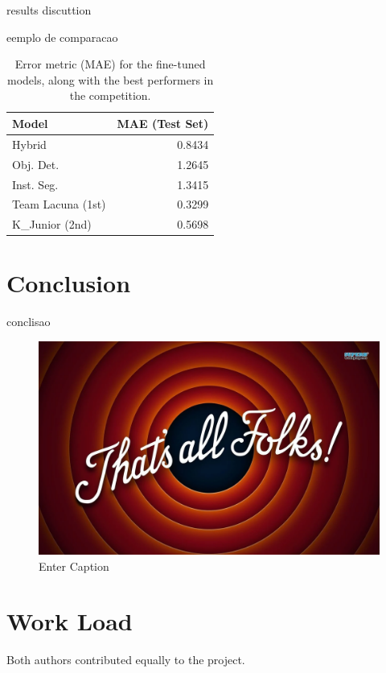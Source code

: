 \documentclass[conference]{IEEEtran}
\begin{document}
results discuttion

eemplo de comparacao

\begin{table}[H]
\centering
\caption{Error metric (MAE) for the fine-tuned models, along with the best performers in the competition.}
\label{tab:model02_results_transposed}
\begin{tabular}{lr}
\toprule
\textbf{Model} & \textbf{MAE (Test Set)} \\
\midrule
Hybrid & 0.8434 \\
Obj. Det. & 1.2645 \\
Inst. Seg. & 1.3415 \\
Team Lacuna (1st) & 0.3299 \\
K\_Junior (2nd) & 0.5698 \\
\bottomrule
\end{tabular}
\end{table}




\section{Conclusion}

conclisao

\begin{figure}[H]
    \centering
    \includegraphics[width=0.5\linewidth]{image.png}
    \caption{Enter Caption}
    \label{fig:enter-label}
\end{figure}
\section*{Work Load}

Both authors contributed equally to the project.



\end{document}
